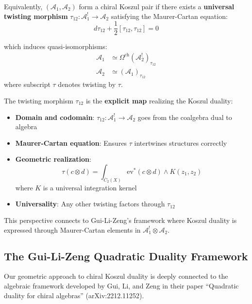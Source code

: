 \begin{definition}
\label{def:chiral-koszul-pair-twisting}
Equivalently, $(\mathcal{A}_1, \mathcal{A}_2)$ form a chiral Koszul pair if there exists 
a \textbf{universal twisting morphism} $\tau_{12}: \mathcal{A}_1^! \to \mathcal{A}_2$ 
satisfying the Maurer-Cartan equation:
$$d\tau_{12} + \frac{1}{2}[\tau_{12}, \tau_{12}] = 0$$

which induces quasi-isomorphisms:
\begin{align}
\mathcal{A}_1 &\simeq \Omega^{\text{ch}}(\mathcal{A}_2^!)_{\tau_{12}} \\
\mathcal{A}_2 &\simeq (\mathcal{A}_1)_{\tau_{12}}
\end{align}
where subscript $\tau$ denotes twisting by $\tau$.
\end{definition}

\begin{remark}
\label{rem:twisting-perspective}
The twisting morphism $\tau_{12}$ is the \textbf{explicit map} realizing the Koszul duality:
\begin{itemize}
\item \textbf{Domain and codomain}: $\tau_{12}: \mathcal{A}_1^! \to \mathcal{A}_2$ goes 
      from the coalgebra dual to algebra
\item \textbf{Maurer-Cartan equation}: Ensures $\tau$ intertwines structures correctly
\item \textbf{Geometric realization}: 
      $$\tau(c \otimes d) = \int_{\overline{C}_2(X)} \text{ev}^*(c \otimes d) \wedge K(z_1, z_2)$$
      where $K$ is a universal integration kernel
\item \textbf{Universality}: Any other twisting factors through $\tau_{12}$
\end{itemize}

This perspective connects to Gui-Li-Zeng's framework where Koszul duality is expressed 
through Maurer-Cartan elements in $\mathcal{A}_1^! \otimes \mathcal{A}_2$.
\end{remark}

\subsection{The Gui-Li-Zeng Quadratic Duality Framework}
\label{subsec:gui-li-zeng-framework}

Our geometric approach to chiral Koszul duality is deeply connected to the algebraic 
framework developed by Gui, Li, and Zeng in their paper ``Quadratic duality for chiral 
algebras'' \cite{GLZ22} (arXiv:2212.11252).

